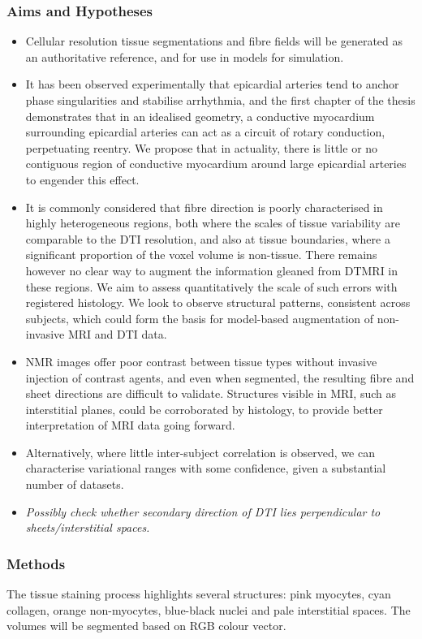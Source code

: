   \subsubsection{Aims and Hypotheses}
    \begin{itemize}
      \item Cellular resolution tissue segmentations and fibre fields will be generated as an authoritative reference, and for use in models for simulation.
      \item It has been observed experimentally that epicardial arteries tend to anchor phase singularities and stabilise arrhythmia, and the first chapter of the thesis demonstrates that in an idealised geometry, a conductive myocardium surrounding epicardial arteries can act as a circuit of rotary conduction, perpetuating reentry. We propose that in actuality, there is little or no contiguous region of conductive myocardium around large epicardial arteries to engender this effect.
      \item It is commonly considered that fibre direction is poorly characterised in highly heterogeneous regions, both where the scales of tissue variability are comparable to the DTI resolution, and also at tissue boundaries, where a significant proportion of the voxel volume is non-tissue. There remains however no clear way to augment the information gleaned from DTMRI in these regions. We aim to assess quantitatively the scale of such errors with registered histology. We look to observe structural patterns, consistent across subjects, which could form the basis for model-based augmentation of non-invasive MRI and DTI data.
      \item NMR images offer poor contrast between tissue types without invasive injection of contrast agents, and even when segmented, the resulting fibre and sheet directions are difficult to validate. Structures visible in MRI, such as interstitial planes, could be corroborated by histology, to provide better interpretation of MRI data going forward.
      \item Alternatively, where little inter-subject correlation is observed, we can characterise variational ranges with some confidence, given a substantial number of datasets.
      \item \emph{Possibly check whether secondary direction of DTI lies perpendicular to sheets/interstitial spaces.}
    \end{itemize}
    
  \subsubsection{Methods}
    The tissue staining process highlights several structures: pink myocytes, cyan collagen, orange non-myocytes, blue-black nuclei and pale interstitial spaces. The volumes will be segmented based on RGB colour vector.
    

